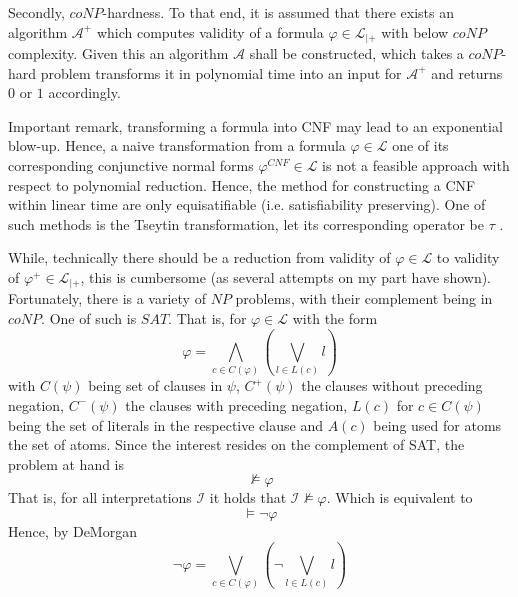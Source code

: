 \documentclass[11pt,a4paper]{article}
\begin{document}
Secondly, $coNP$-hardness. To that end, it is assumed that there exists an algorithm $\mathcal{A}^+$ which computes validity of a formula $\varphi \in \mathcal{L}_{|+}$ with below $coNP$ complexity. Given this an algorithm $\mathcal{A}$ shall be constructed, which takes a $coNP$-hard problem transforms it in polynomial time into an input for $\mathcal{A}^+$ and returns $0$ or $1$ accordingly. 


Important remark, transforming a formula into CNF may lead to an exponential blow-up. Hence, a naive transformation from a formula $\varphi \in \mathcal{L}$ one of its corresponding conjunctive normal forms $\varphi^{CNF} \in \mathcal{L}$ is not a feasible approach with respect to polynomial reduction. Hence, the method for constructing a CNF within linear time are only equisatifiable (i.e. satisfiability  preserving). One of such methods is the Tseytin transformation, let its corresponding operator be $\tau$ \cite{wikiCNF}. 


While, technically there should be a reduction from validity of $\varphi \in \mathcal{L}$ to validity of $\varphi^+ \in \mathcal{L}_{|+}$, this is cumbersome (as several attempts on my part have shown). Fortunately, there is a variety of $NP$ problems, with their complement being in $coNP$. One of such is $SAT$. That is, for $\varphi \in \mathcal{L}$ with the form
\begin{equation*}
\varphi=  \bigwedge_{c \in C(\varphi)}   (\bigvee_{l \in L(c)} l )
\end{equation*}
with $C(\psi)$ being set of clauses in $\psi$, $C^+(\psi)$ the clauses without preceding negation, $C^-(\psi)$ the clauses with preceding negation, $L(c)$ for $c \in C(\psi)$ being the set of literals in the respective clause and $A(c)$ being used for atoms the set of atoms. 
Since the interest resides on the complement of SAT, the problem at hand is 
\begin{equation*}
\nvDash \varphi
\end{equation*}
That is, for all interpretations $\mathcal{I}$ it holds that $\mathcal{I} \nvDash \varphi$.
Which is equivalent to
\begin{equation*}
\models \neg \varphi 
\end{equation*}
Hence, by DeMorgan 
\begin{equation*}
\neg\varphi = \bigvee_{c \in C(\varphi)}   (\neg \bigvee_{l \in L(c)} l )
\end{equation*}
\end{document}
